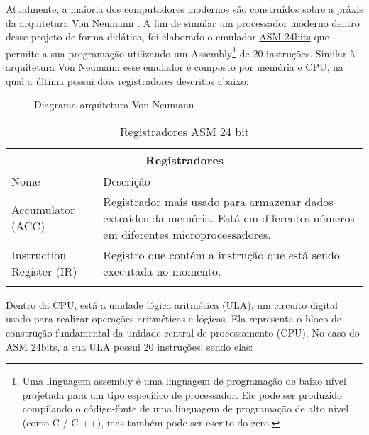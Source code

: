 Atualmente, a maioria dos computadores modernos são construídos sobre a práxis da arquitetura Von Neumann \cite{2}. A fim de simular um processador moderno dentro desse projeto de forma didática, foi elaborado o emulador \href{https://gzsig.io/vm-24bits/}{ASM 24bits} que permite a sua programação utilizando um Assembly\footnote{Uma linguagem assembly é uma linguagem de programação de baixo nível projetada para um tipo específico de processador. Ele pode ser produzido compilando o código-fonte de uma linguagem de programação de alto nível (como C / C ++), mas também pode ser escrito do zero.} de 20 instruções. Similar à arquitetura Von Neumann esse emulador é composto por memória e CPU, na qual a última possui dois registradores descritos abaixo:

\vspace{1cm}
\begin{figure}[H] \centering 
  \caption{\label{von_neumann_architecture} Diagrama arquitetura Von Neumann} 
\end{figure}

\vspace{1cm}
\begin{longtable}{ |p{3cm}||p{11cm}|  }
  \hline
  \multicolumn{2}{|c|}{Registradores} \\
  \hline
    Nome &
    Descrição\\
  \hline
    Accumulator (ACC) &
    Registrador mais usado para armazenar dados extraídos da memória. Está em diferentes números em diferentes microprocessadores. \\
  \hline
    Instruction Register (IR) &
    Registro que contém a instrução que está sendo executada no momento. \\
  \hline
  \caption{Registradores ASM 24 bit}
  \label{registers_asm}
\end{longtable}
\vspace{1cm}

Dentro da CPU, está a unidade lógica aritmética (ULA), um circuito digital usado para realizar operações aritméticas e lógicas. Ela representa o bloco de construção fundamental da unidade central de processamento (CPU). No caso do ASM 24bits, a sua ULA possui 20 instruções, sendo elas:

